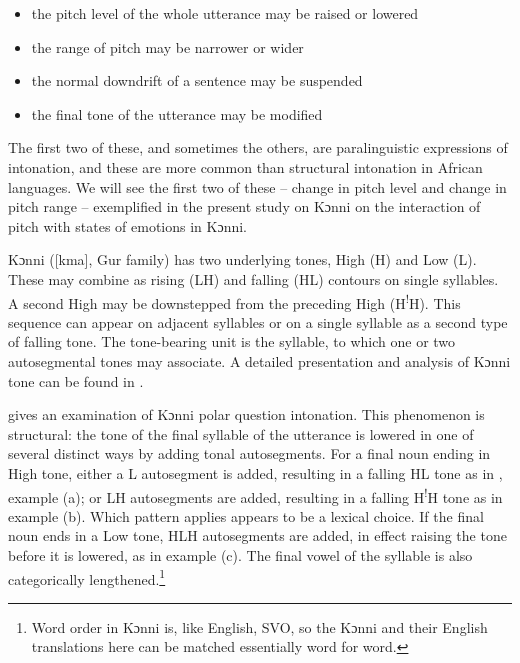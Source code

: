 \documentclass[output=paper]{langsci/langscibook}
\begin{document}
\begin{itemize}
\item the pitch level of the whole utterance may be raised or lowered
\item the range of pitch may be narrower or wider
\item the normal downdrift of a sentence may be suspended
\item the final tone of the utterance may be modified
\end{itemize}

The first two of these, and sometimes the others, are paralinguistic expressions of intonation, and these are more common than structural intonation in African languages. We will see the first two of these -- change in pitch level and change in pitch range -- exemplified in the present study on Kɔnni on the interaction of pitch with states of emotions in Kɔnni.

Kɔnni ([kma], Gur family) has two underlying tones, High (H) and Low (L). These may combine as rising (LH) and falling (HL) contours on single syllables. A second High may be downstepped from the preceding High (H\textsuperscript{!}H). This sequence can appear on adjacent syllables or on a single syllable as a second type of falling tone. The tone-bearing unit is the syllable, to which one or two autosegmental tones may associate. A detailed presentation and analysis of Kɔnni tone can be found in \citet{cahill2007}. 

\citet{cahill2012} gives an examination of Kɔnni polar question intonation. This phenomenon is structural: the tone of the final syllable of the utterance is lowered in one of several distinct ways by adding tonal autosegments. For a final noun ending in High tone, either a L autosegment is added, resulting in a falling HL tone as in , example (a); or LH autosegments are added, resulting in a falling H\textsuperscript{!}H tone as in example (b). Which pattern applies appears to be a lexical choice. If the final noun ends in a Low tone, HLH autosegments are added, in effect raising the tone before it is lowered, as in example (c). The final vowel of the syllable is also categorically lengthened.\footnote{Word order in Kɔnni is, like English, SVO, so the Kɔnni and their English translations here can be matched essentially word for word.}
\end{document}
